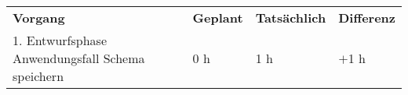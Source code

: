 \begin{tabularx}{\textwidth}{Xlll}
\rowcolor{heading}\textbf{Vorgang} & \textbf{Geplant} & \textbf{Tatsächlich} & \textbf{Differenz} \\
1. Entwurfsphase Anwendungsfall Schema speichern & 0 h & 1 h   & $+$1 h \\
\end{tabularx}